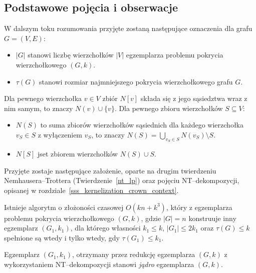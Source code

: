 \subsection{Podstawowe pojęcia i obserwacje}\label{ss_ckx_preliminaries}
\par{
  W dalszym toku rozumowania przyjęte zostaną następujące oznaczenia dla grafu $G=(V, E)$:
  \begin{itemize}
    \item $|G|$ stanowi liczbę wierzchołków $|V|$ egzemplarza problemu pokrycia wierzchołkowego $(G, k)$.
    \item $\tau(G)$ stanowi rozmiar najmniejszego pokrycia wierzchołkowego grafu $G$.
  \end{itemize}
  Dla pewnego wierzchołka $v \in V$ zbiór $N[v]$ składa się z jego sąsiedztwa wraz z nim samym, to znaczy $N(v) \cup \{v\}$.
  Dla pewnego zbioru wierzchołków $S \subseteq V$:
  \begin{itemize}
    \item $N(S)$ to suma zbiorów wierzchołków sąsiednich dla każdego wierzchołka $v_S \in S$ z wyłączeniem $v_S$, to znaczy $N(S)=\bigcup_{v_S\in S}N(v_S) \setminus S$.
    \item $N[S]$ jset zbiorem wierzchołków $N(S) \cup S$.
  \end{itemize}

  Przyjęte zostaje następujące założenie, oparte na drugim twierdzeniu Nemhausera--Trottera (Twierdzenie~\ref{nt_lp}) oraz pojęciu NT--dekompozycji, opisanej w rozdziale~\ref{sss_kernelization_crown_context}.
  \begin{proposition}
    Istnieje algorytm o złożoności czasowej $O(kn + k^3)$, który z egzemplarza problemu pokrycia wierzchołkowego $(G, k)$, gdzie $|G|=n$ konstruuje inny egzemplarz $(G_1, k_1)$, dla którego własności $k_1 \leq k$, $|G_1| \leq 2k_1$ oraz $\tau(G) \leq k$ spełnione są wtedy i tylko wtedy, gdy $\tau(G_1) \leq k_1$.
  \end{proposition}

  \begin{definition}
    Egzemplarz $(G_1, k_1)$, otrzymany przez redukcję egzemplarza $(G, k)$ z wykorzystaniem NT--dekompozycji stanowi \emph{jądro} egzemplarza $(G, k)$.
  \end{definition}
}
